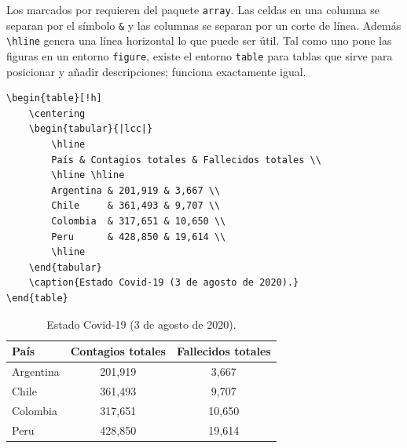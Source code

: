 Los marcados por \dag{} requieren del paquete \texttt{array}. Las celdas en una columna se separan por el símbolo \texttt{\&} y las columnas se separan por un corte de línea. Además \lstinline|\hline| genera una línea horizontal lo que puede ser útil. Tal como uno pone las figuras en un entorno \texttt{figure}, existe el entorno \texttt{table} para tablas que sirve para posicionar y añadir descripciones; funciona exactamente igual.
\begin{lstlisting}
\begin{table}[!h]
	\centering
	\begin{tabular}{|lcc|}
		\hline
		País & Contagios totales & Fallecidos totales \\
		\hline \hline
		Argentina & 201,919 & 3,667 \\
		Chile     & 361,493 & 9,707 \\
		Colombia  & 317,651 & 10,650 \\
		Peru      & 428,850 & 19,614 \\
		\hline
	\end{tabular}
	\caption{Estado Covid-19 (3 de agosto de 2020).}
\end{table}
\end{lstlisting}
\begin{table}[!h]
	\centering
	\begin{tabular}{|lcc|}
		\hline
		País & Contagios totales & Fallecidos totales \\
		\hline \hline
		Argentina & 201,919 & 3,667 \\
		Chile     & 361,493 & 9,707 \\
		Colombia  & 317,651 & 10,650 \\
		Peru      & 428,850 & 19,614 \\
		\hline
	\end{tabular}
	\caption{Estado Covid-19 (3 de agosto de 2020).}
\end{table}

